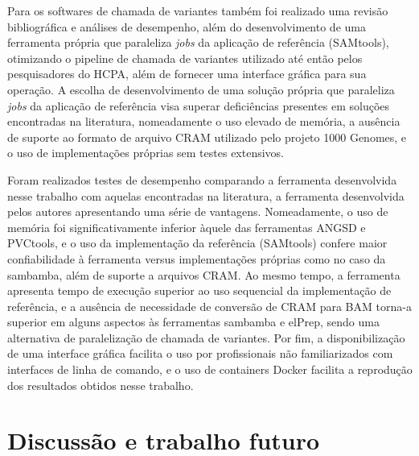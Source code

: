 \documentclass[cic,tc]{iiufrgs}
\begin{document}
Para os softwares de chamada de variantes também foi realizado uma revisão
bibliográfica e análises de desempenho, além do desenvolvimento de uma
ferramenta própria que paraleliza \textit{jobs} da aplicação de referência
(SAMtools), otimizando o pipeline de chamada de variantes utilizado até então
pelos pesquisadores do HCPA, além de fornecer uma interface gráfica para sua
operação. A escolha de desenvolvimento de uma solução própria que paraleliza
\textit{jobs} da aplicação de referência visa superar deficiências presentes em
soluções encontradas na literatura, nomeadamente o uso elevado de memória, a
ausência de suporte ao formato de arquivo CRAM utilizado pelo projeto 1000
Genomes, e o uso de implementações próprias sem testes extensivos.

Foram realizados testes de desempenho comparando a ferramenta desenvolvida
nesse trabalho com aquelas encontradas na literatura, a ferramenta desenvolvida
pelos autores apresentando uma série de vantagens. Nomeadamente, o uso de
memória foi significativamente inferior àquele das ferramentas ANGSD e
PVCtools, e o uso da implementação da referência (SAMtools) confere maior
confiabilidade à ferramenta versus implementações próprias como no caso da
sambamba, além de suporte a arquivos CRAM. Ao mesmo tempo, a ferramenta
apresenta tempo de execução superior ao uso sequencial da implementação de
referência, e a ausência de necessidade de conversão de CRAM para BAM torna-a
superior em alguns aspectos às ferramentas sambamba e elPrep, sendo uma
alternativa de paralelização de chamada de variantes. Por fim, a
disponibilização de uma interface gráfica facilita o uso por profissionais não
familiarizados com interfaces de linha de comando, e o uso de containers Docker
facilita a reprodução dos resultados obtidos nesse trabalho.

\section{Discussão e trabalho futuro}
\end{document}
